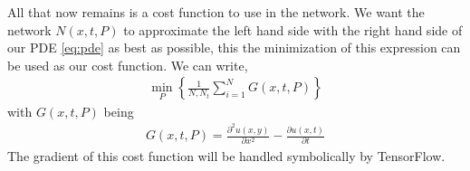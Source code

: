 All that now remains is a cost function to use in the network. We want the network $N(x,t,P)$ to approximate the left hand side with the right hand side of our PDE \eqref{eq:pde} as best as possible\cite[p. 5]{hein-odenn}, this the minimization of this expression can be used as our cost function. We can write,
\begin{align}
    \underset{P}{\min} \left\{\frac{1}{N,N_t} \sum^N_{i=1} G(x,t,P) \right\}
    \label{eq:pde-cost-function}
\end{align}
with $G(x,t,P)$ being
\begin{align}
    G(x, t, P) = \frac{\partial^2 u(x,y)}{\partial x^2} - \frac{\partial u(x,t)}{\partial t} 
\end{align}
The gradient of this cost function will be handled symbolically by TensorFlow\cite{tensorflow2015-whitepaper}.

